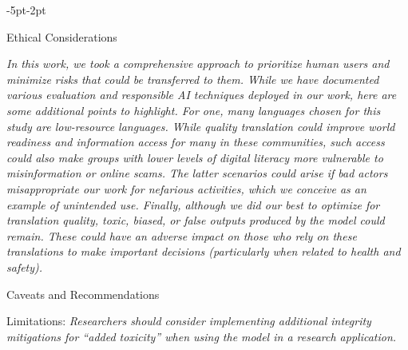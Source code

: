\begin{adjustwidth}{-5pt}{-2pt}
\begin{singlespace}
\begin{tcolorbox}[title=\textbf{\section{Model Card - \mfourttwo}\label{card:mfourttwo}},
    breakable, sharp corners, boxrule=0.5pt]
\begin{mcsection}{Ethical Considerations}
 \item \textit{In this work, we took a comprehensive approach to prioritize human users and minimize risks that could be transferred to them. While we have documented various evaluation and responsible AI techniques deployed in our work, here are some additional points to highlight. For one, many languages chosen for this study are low-resource languages.
 While quality translation could improve world readiness and information access for many in these communities, such access could also make groups with lower levels of digital literacy more vulnerable to misinformation or online scams. The latter scenarios could arise if bad actors misappropriate our work for nefarious activities, which we conceive as an example of unintended use.
 Finally, although we did our best to optimize for translation quality, toxic, biased, or false outputs produced by the model could remain. These could have an adverse impact on those who rely on these translations to make important decisions (particularly when related to health and safety).} 
\end{mcsection}


\begin{mcsection}{Caveats and Recommendations}
  \item Limitations: \textit{Researchers should consider implementing additional integrity mitigations for ``added toxicity'' when using the model in a research application.}
\end{mcsection}


\end{tcolorbox}
\end{singlespace}
\end{adjustwidth}
